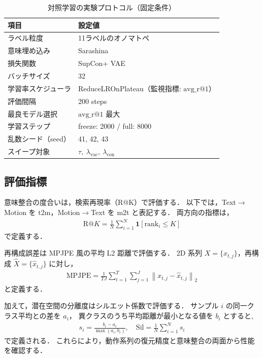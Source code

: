 \begin{table}[H]
  \centering
  \caption{対照学習の実験プロトコル（固定条件）}
  \label{tab:contrastive_setup}
  \begin{tabular}{ll} \toprule
    \textbf{項目} & \textbf{設定値} \\ \midrule
    ラベル粒度    & 11ラベルのオノマトペ \\
    意味埋め込み  & Sarashina \\
    損失関数      & SupCon+ VAE \\
    バッチサイズ  & 32 \\
    学習率スケジューラ & ReduceLROnPlateau（監視指標: $\mathrm{avg\_r@1}$） \\
    評価間隔      & 200 steps \\
    最良モデル選択& $\mathrm{avg\_r@1}$ 最大 \\
    学習ステップ  & freeze: 2000 / full: 8000 \\
    乱数シード（seed） & 41, 42, 43 \\
    スイープ対象  & $\tau,\ \lambda_{\mathrm{vae}},\ \lambda_{\mathrm{con}}$ \\ \bottomrule
  \end{tabular}
\end{table}


\subsection{評価指標}
\label{subsec:contrastive_metrics}

意味整合の度合いは，検索再現率（R@K）で評価する．
以下では，Text$\rightarrow$Motion を t2m，Motion$\rightarrow$Text を m2t と表記する．
両方向の指標は，
\begin{align}
  \mathrm{R@}K
  = \frac{1}{N}\sum_{i=1}^{N}\mathbf{1}\!\left[\mathrm{rank}_i \le K\right]
\end{align}
で定義する．

再構成誤差は MPJPE 風の平均 L2 距離で評価する．
2D 系列 $X=\{x_{t,j}\}$，再構成 $\hat{X}=\{\hat{x}_{t,j}\}$ に対し，
\begin{align}
  \mathrm{MPJPE}
  = \frac{1}{T J}\sum_{t=1}^{T}\sum_{j=1}^{J}\left\|x_{t,j}-\hat{x}_{t,j}\right\|_2
\end{align}
と定義する．

加えて，潜在空間の分離度はシルエット係数で評価する．
サンプル $i$ の同一クラス平均との差を $a_i$，
異クラスのうち平均距離が最小となる値を $b_i$ とすると,
\begin{align}
  s_i = \frac{b_i - a_i}{\max(a_i, b_i)},\quad
  \mathrm{Sil} = \frac{1}{N}\sum_{i=1}^{N}s_i
\end{align}
で定義される．
これらにより，動作系列の復元精度と意味整合の両面から性能を確認する．

